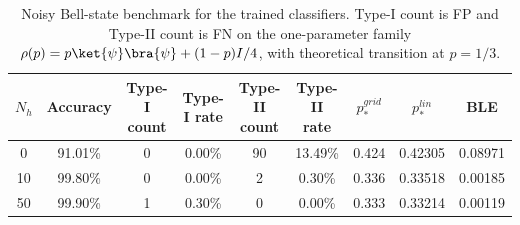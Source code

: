\begin{table}[H]
\centering
\small
\begin{tabular}{ccccccccc}
\toprule
$N_h$ & Accuracy & Type-I count & Type-I rate & Type-II count & Type-II rate & $p_\ast^{grid}$ & $p_\ast^{lin}$ & BLE \\
\midrule
0 & 91.01\% & 0 & 0.00\% & 90 & 13.49\% & 0.424 & 0.42305 & 0.08971 \\
10 & 99.80\% & 0 & 0.00\% & 2 & 0.30\% & 0.336 & 0.33518 & 0.00185 \\
50 & 99.90\% & 1 & 0.30\% & 0 & 0.00\% & 0.333 & 0.33214 & 0.00119 \\
\bottomrule
\end{tabular}
\caption{Noisy Bell-state benchmark for the trained classifiers. Type-I count is FP and Type-II count is FN on the one-parameter family $\rho(p)=p\ket{\psi}\bra{\psi}+(1-p)I/4$, with theoretical transition at $p=1/3$.}
\label{tab:noisy_bell_benchmark}
\end{table}
